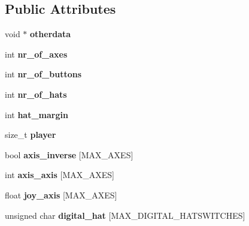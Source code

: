 \subsection*{Public Attributes}
\begin{DoxyCompactItemize}
\item 
void $\ast$ {\bfseries otherdata}\hypertarget{classJoyStick_a21c9937b7dea3bce97fc67c22e6789af}{}\label{classJoyStick_a21c9937b7dea3bce97fc67c22e6789af}

\item 
int {\bfseries nr\+\_\+of\+\_\+axes}\hypertarget{classJoyStick_ae994c848c5f44fc395fa4746cb11e9eb}{}\label{classJoyStick_ae994c848c5f44fc395fa4746cb11e9eb}

\item 
int {\bfseries nr\+\_\+of\+\_\+buttons}\hypertarget{classJoyStick_a4daf6d5c2a4a873b32b12136006acd85}{}\label{classJoyStick_a4daf6d5c2a4a873b32b12136006acd85}

\item 
int {\bfseries nr\+\_\+of\+\_\+hats}\hypertarget{classJoyStick_a21e1272d2b82de94f84b814525c96aa2}{}\label{classJoyStick_a21e1272d2b82de94f84b814525c96aa2}

\item 
int {\bfseries hat\+\_\+margin}\hypertarget{classJoyStick_aa3020ebb4ecc501a65dcff01d2b70c39}{}\label{classJoyStick_aa3020ebb4ecc501a65dcff01d2b70c39}

\item 
size\+\_\+t {\bfseries player}\hypertarget{classJoyStick_a63e52b170cc69dbe133dd79446228b16}{}\label{classJoyStick_a63e52b170cc69dbe133dd79446228b16}

\item 
bool {\bfseries axis\+\_\+inverse} \mbox{[}M\+A\+X\+\_\+\+A\+X\+ES\mbox{]}\hypertarget{classJoyStick_a1bbfa26af9423cb91b2d722a06dd758c}{}\label{classJoyStick_a1bbfa26af9423cb91b2d722a06dd758c}

\item 
int {\bfseries axis\+\_\+axis} \mbox{[}M\+A\+X\+\_\+\+A\+X\+ES\mbox{]}\hypertarget{classJoyStick_a4bcb362c546831b5916297b4fa392dd2}{}\label{classJoyStick_a4bcb362c546831b5916297b4fa392dd2}

\item 
float {\bfseries joy\+\_\+axis} \mbox{[}M\+A\+X\+\_\+\+A\+X\+ES\mbox{]}\hypertarget{classJoyStick_a7c4a786a1f26ba266d624b99433b58e4}{}\label{classJoyStick_a7c4a786a1f26ba266d624b99433b58e4}

\item 
unsigned char {\bfseries digital\+\_\+hat} \mbox{[}M\+A\+X\+\_\+\+D\+I\+G\+I\+T\+A\+L\+\_\+\+H\+A\+T\+S\+W\+I\+T\+C\+H\+ES\mbox{]}\hypertarget{classJoyStick_a6e255a810129143cfbd033e7df56b4d2}{}\label{classJoyStick_a6e255a810129143cfbd033e7df56b4d2}


\end{DoxyCompactItemize}
